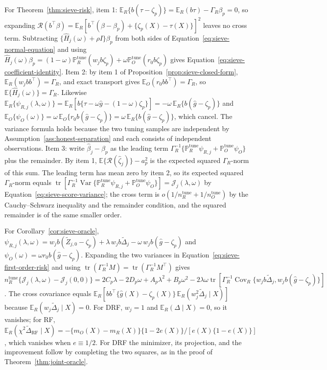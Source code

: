For Theorem~\ref{thm:sieve-risk}, item 1: $\mathbb E_R\{b(\tau-\zeta_p)\}=\mathbb E_R(b\tau)-\Gamma_R\beta_p=0$, so expanding $\mathcal R(b^\top\beta)=\mathbb E_R[b^\top(\beta-\beta_p)+\{\zeta_p(X)-\tau(X)\}]^2$ leaves no cross term. Subtracting $\{\widehat H_j(\omega)+\rho I\}\beta_p$ from both sides of Equation~\eqref{eq:sieve-normal-equation} and using $\widehat H_j(\omega)\beta_p=(1-\omega)\mathbb P_R^{\mathrm{tune}}(w_jb\zeta_p)+\omega\mathbb P_O^{\mathrm{tune}}(r_0b\zeta_p)$ gives Equation~\eqref{eq:sieve-coefficient-identity}. Item 2: by item 1 of Proposition~\ref{prop:sieve-closed-form}, $\mathbb E_R(w_jbb^\top)=\Gamma_R$, and exact transport gives $\mathbb E_O(r_0bb^\top)=\Gamma_R$, so $\mathbb E\{\widehat H_j(\omega)\}=\Gamma_R$. Likewise $\mathbb E_R\{\psi_{R,j}(\lambda,\omega)\}=\mathbb E_R[b\{\tau-\omega\widehat g-(1-\omega)\zeta_p\}]=-\omega\,\mathbb E_R\{b(\widehat g-\zeta_p)\}$ and $\mathbb E_O\{\psi_O(\omega)\}=\omega\,\mathbb E_O\{r_0b(\widehat g-\zeta_p)\}=\omega\,\mathbb E_R\{b(\widehat g-\zeta_p)\}$, which cancel. The variance formula holds because the two tuning samples are independent by Assumption~\ref{ass:honest-separation} and each consists of independent observations. Item 3: write $\widehat\beta_j-\beta_p$ as the leading term $\Gamma_R^{-1}\{\mathbb P_R^{\mathrm{tune}}\psi_{R,j}+\mathbb P_O^{\mathrm{tune}}\psi_O\}$ plus the remainder. By item 1, $\mathbb E\{\mathcal R(\widehat\zeta_j)\}-a_p^2$ is the expected squared $\Gamma_R$-norm of this sum. The leading term has mean zero by item 2, so its expected squared $\Gamma_R$-norm equals $\operatorname{tr}[\Gamma_R^{-1}\operatorname{Var}\{\mathbb P_R^{\mathrm{tune}}\psi_{R,j}+\mathbb P_O^{\mathrm{tune}}\psi_O\}]=\mathcal J_j(\lambda,\omega)$ by Equation~\eqref{eq:sieve-score-variance}; the cross term is $o(1/n_R^{\mathrm{tune}}+1/n_O^{\mathrm{tune}})$ by the Cauchy--Schwarz inequality and the remainder condition, and the squared remainder is of the same smaller order.

For Corollary~\ref{cor:sieve-oracle}, $\psi_{R,j}(\lambda,\omega)=w_jb(\widetilde Z_{j,0}-\zeta_p)+\lambda\,w_jb\widetilde\Delta_j-\omega\,w_jb(\widehat g-\zeta_p)$ and $\psi_O(\omega)=\omega r_0b(\widehat g-\zeta_p)$. Expanding the two variances in Equation~\eqref{eq:sieve-first-order-risk} and using $\operatorname{tr}(\Gamma_R^{-1}M)=\operatorname{tr}(\Gamma_R^{-1}M^\top)$ gives $n_R^{\mathrm{tune}}\{\mathcal J_j(\lambda,\omega)-\mathcal J_j(0,0)\}=2C_p\lambda-2D_p\omega+A_p\lambda^2+B_p\omega^2-2\lambda\omega\operatorname{tr}[\Gamma_R^{-1}\operatorname{Cov}_R\{w_jb\widetilde\Delta_j,w_jb(\widehat g-\zeta_p)\}]$. The cross covariance equals $\mathbb E_R[bb^\top\{\widehat g(X)-\zeta_p(X)\}\,\mathbb E_R(w_j^2\widetilde\Delta_j\mid X)]$ because $\mathbb E_R(w_j\widetilde\Delta_j\mid X)=0$. For DRF, $w_j=1$ and $\mathbb E_R(\Delta\mid X)=0$, so it vanishes; for RF, $\mathbb E_R(\chi^2\widetilde\Delta_{\mathrm{RF}}\mid X)=-\{m_O(X)-m_R(X)\}\{1-2e(X)\}/[e(X)\{1-e(X)\}]$, which vanishes when $e\equiv1/2$. For DRF the minimizer, its projection, and the improvement follow by completing the two squares, as in the proof of Theorem~\ref{thm:joint-oracle}.

